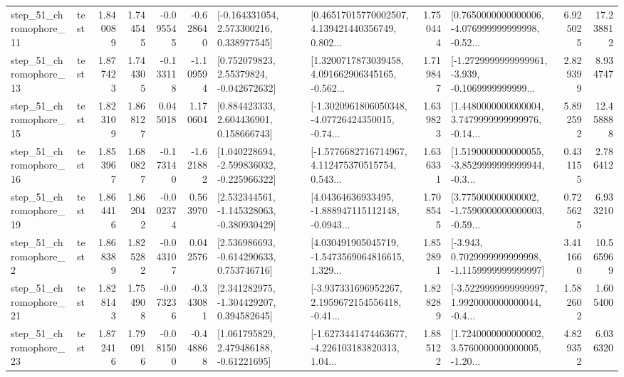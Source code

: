 \begin{tabular}{llrrrrllrlrr}
   step\_51\_chromophore\_11 &      test &      1.840089 &    1.744545 &     -0.095545 & -0.628640 &    [-0.164331054, 2.573300216, 0.338977545] &  [0.46517015770002507, 4.139421440356749, 0.802... &       1.750444 &  [0.7650000000000006, -4.076999999999998, -0.52... &            6.925025 &         17.238812 \\
   step\_51\_chromophore\_13 &      test &      1.877423 &    1.744305 &     -0.133118 & -1.109594 &     [0.752079823, 2.55379824, -0.042672632] &  [1.3200717873039458, 4.091662906345165, -0.562... &       1.719847 &  [-1.2729999999999961, -3.939, -0.1069999999999... &            2.829399 &          8.934747 \\
   step\_51\_chromophore\_15 &      test &      1.823109 &    1.868127 &      0.045018 &  1.170604 &     [0.884423333, 2.604436901, 0.158666743] &  [-1.3020961806050348, -4.07726424350015, -0.74... &       1.639823 &  [1.4480000000000004, 3.7479999999999976, -0.14... &            5.892592 &         12.458888 \\
   step\_51\_chromophore\_16 &      test &      1.853967 &    1.680827 &     -0.173140 & -1.621882 &   [1.040228694, -2.599836032, -0.225966322] &  [-1.5776682716714967, 4.112475370515754, 0.543... &       1.636331 &  [1.5190000000000055, -3.8529999999999944, -0.3... &            0.431155 &          2.786412 \\
   step\_51\_chromophore\_19 &      test &      1.864416 &    1.862042 &     -0.002374 &  0.563970 &   [2.532344561, -1.145328063, -0.380930429] &  [4.04364636933495, -1.888947115112148, -0.0943... &       1.708545 &  [3.775000000000002, -1.7590000000000003, -0.59... &            0.725625 &          6.933210 \\
    step\_51\_chromophore\_2 &      test &      1.868389 &    1.825282 &     -0.043107 &  0.042576 &    [2.536986693, -0.614290633, 0.753746716] &  [4.030491905045719, -1.5473569064816615, 1.329... &       1.852891 &  [-3.943, 0.7029999999999998, -1.1159999999999997] &            3.411660 &         10.565969 \\
   step\_51\_chromophore\_21 &      test &      1.828143 &    1.754908 &     -0.073236 & -0.343081 &    [2.341282975, -1.304429207, 0.394582645] &  [-3.937331696952267, 2.1959672154556418, -0.41... &       1.828289 &  [-3.5229999999999997, 1.9920000000000044, -0.4... &            1.582602 &          1.605400 \\
   step\_51\_chromophore\_23 &      test &      1.872416 &    1.790916 &     -0.081500 & -0.448868 &     [1.061795829, 2.479486188, -0.61221695] &  [-1.6273441474463677, -4.226103183820313, 1.04... &       1.885122 &  [1.7240000000000002, 3.5760000000000005, -1.20... &            4.829352 &          6.036320 \\

\end{tabular}
